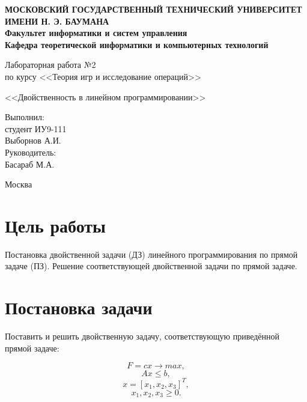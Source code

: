 \documentclass[12pt,a4paper,oneside]{extarticle}
\begin{document}
\pgfplotsset{compat=1.8}

\thispagestyle{empty}
\newpage
{
\centering


\textbf{
МОСКОВСКИЙ ГОСУДАРСТВЕННЫЙ ТЕХНИЧЕСКИЙ УНИВЕРСИТЕТ ИМЕНИ Н. Э. БАУМАНА \\
Факультет информатики и систем управления \\
Кафедра теоретической информатики и компьютерных технологий}
\bigskip
\bigskip
\bigskip
\bigskip
\bigskip
\bigskip
\bigskip

\vfill


Лабораторная работа №2 \\
по курсу <<Теория игр и исследование операций>>

\bigskip

{\large <<Двойственность в линейном программировании>>}
\bigskip

\vfill



\hfill\parbox{4cm} {
Выполнил:\\
студент ИУ9-111 \hfill \\
Выборнов А.И.\hfill \medskip\\
Руководитель:\\
Басараб М.А.\hfill
}


\vspace{\fill}

Москва \number\year
\clearpage
}



\clearpage


\section{Цель работы}
    Постановка двойственной задачи (ДЗ) линейного программирования по прямой задаче (ПЗ). Решение соответствующей двойственной задачи по прямой задаче.

\section{Постановка задачи}
    Поставить и решить двойственную задачу, соответствующую приведённой прямой задаче:
    
    $$F = cx \rightarrow max,$$
    $$Ax \leq b,$$ 
    $$x = [x_1, x_2, x_3]^T,$$
    $$x_1, x_2, x_3 \geq 0.$$
\end{document}
